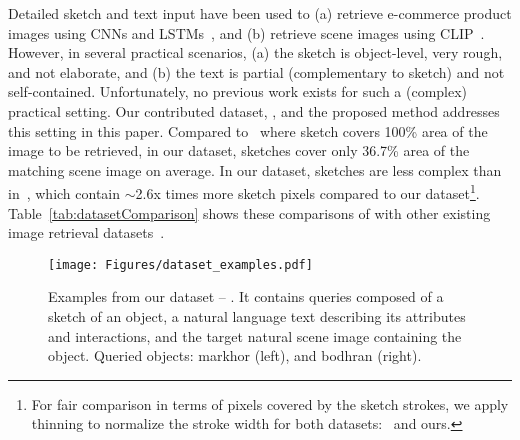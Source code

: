 Detailed sketch and text input have been used to (a) retrieve e-commerce product images using CNNs and LSTMs~\cite{song2017fine}, and (b) retrieve scene images using CLIP~\cite{sangkloy2022sketch,chowdhury2023scenetrilogy}. However, in several practical scenarios, 
(a) the sketch is object-level, very rough, and not elaborate, and (b) the text is partial (complementary to sketch) and not self-contained. Unfortunately, no previous work exists for such a (complex) practical setting. Our contributed dataset, \data{}, and the proposed method addresses this setting in this paper. Compared to~\cite{sangkloy2022sketch} where sketch covers 100\% area of the image to be retrieved, in our dataset, sketches cover only 36.7\% area of the matching scene image on average.
In our dataset, sketches are less complex than in~\cite{sangkloy2022sketch}, which contain $\sim$2.6x times more sketch pixels compared to our dataset\footnote{For fair comparison in terms of pixels covered by the sketch strokes, we apply thinning to normalize the stroke width for both datasets:~\cite{sangkloy2022sketch} and ours.}. Table~\ref{tab:datasetComparison} shows these comparisons of \data{} with other existing image retrieval datasets~\cite{eitz2012humans,yu2016sketch,lin2014microsoft,young2014image,chowdhury2022fs}.

\begin{figure}[!t]
    \centering
     \texttt{[image: Figures/dataset\_examples.pdf]}
          \caption{Examples from our dataset -- \data{}. It contains queries composed of a sketch of an object, a natural language text describing its attributes and interactions, and the target natural scene image containing the object. Queried objects: markhor (left), and bodhran (right).}
    \label{fig:datasetExamples}
\end{figure}
